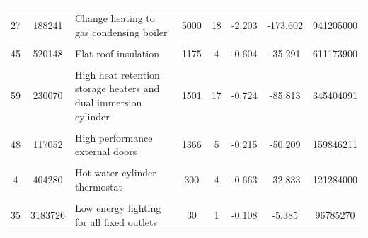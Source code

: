 \begin{table}[!h]
{\begin{tabular}[t]{cc p{6cm} ccccc}
\addlinespace
\cellcolor{gray!10}{46} & \cellcolor{gray!10}{486904} & \cellcolor{gray!10}{Room-in-roof insulation} & \cellcolor{gray!10}{2100} & \cellcolor{gray!10}{8} & \cellcolor{gray!10}{-1.919} & \cellcolor{gray!10}{-49.068} & \cellcolor{gray!10}{1022498400}\\
27 & 188241 & Change heating to gas condensing boiler & 5000 & 18 & -2.203 & -173.602 & 941205000\\
\cellcolor{gray!10}{11} & \cellcolor{gray!10}{1831495} & \cellcolor{gray!10}{Upgrade heating controls} & \cellcolor{gray!10}{400} & \cellcolor{gray!10}{2} & \cellcolor{gray!10}{-0.319} & \cellcolor{gray!10}{-15.115} & \cellcolor{gray!10}{732598000}\\
45 & 520148 & Flat roof insulation & 1175 & 4 & -0.604 & -35.291 & 611173900\\
\cellcolor{gray!10}{5} & \cellcolor{gray!10}{1656813} & \cellcolor{gray!10}{Increase loft insulation to 270 mm} & \cellcolor{gray!10}{225} & \cellcolor{gray!10}{3} & \cellcolor{gray!10}{-0.452} & \cellcolor{gray!10}{-26.047} & \cellcolor{gray!10}{372782925}\\
59 & 230070 & High heat retention storage heaters and dual immersion cylinder & 1501 & 17 & -0.724 & -85.813 & 345404091\\
\cellcolor{gray!10}{60} & \cellcolor{gray!10}{210162} & \cellcolor{gray!10}{High heat retention storage heaters} & \cellcolor{gray!10}{1346} & \cellcolor{gray!10}{9} & \cellcolor{gray!10}{-0.489} & \cellcolor{gray!10}{-64.509} & \cellcolor{gray!10}{282899068}\\
48 & 117052 & High performance external doors & 1366 & 5 & -0.215 & -50.209 & 159846211\\
\cellcolor{gray!10}{56} & \cellcolor{gray!10}{101427} & \cellcolor{gray!10}{Replacement glazing units} & \cellcolor{gray!10}{1200} & \cellcolor{gray!10}{1} & \cellcolor{gray!10}{-0.146} & \cellcolor{gray!10}{-16.667} & \cellcolor{gray!10}{121712400}\\
4 & 404280 & Hot water cylinder thermostat & 300 & 4 & -0.663 & -32.833 & 121284000\\
\addlinespace
\cellcolor{gray!10}{50} & \cellcolor{gray!10}{149896} & \cellcolor{gray!10}{Flue gas heat recovery device in conjunction with boiler} & \cellcolor{gray!10}{650} & \cellcolor{gray!10}{4} & \cellcolor{gray!10}{0.562} & \cellcolor{gray!10}{-42.050} & \cellcolor{gray!10}{97432400}\\
35 & 3183726 & Low energy lighting for all fixed outlets & 30 & 1 & -0.108 & -5.385 & 96785270\\

\end{tabular}}
\end{table}
